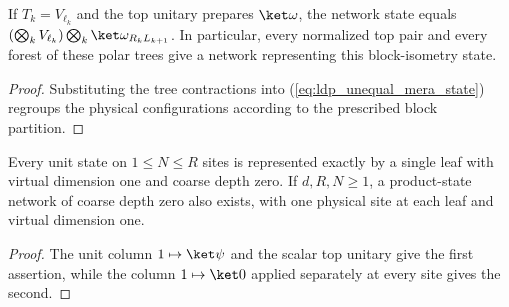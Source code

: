 \begin{lemma}
    \label{thm:ldp_unequal_mera_polar_state}
    \leanok
    If $T_k=V_{\ell_k}$ and the top unitary prepares $\ket\omega$,
    the network state equals
    $(\bigotimes_k V_{\ell_k})\bigotimes_k\ket\omega_{R_kL_{k+1}}$.
    In particular, every normalized top pair and every forest of
    these polar trees give a network representing this block-isometry state.
\end{lemma}
\begin{proof}
    \leanok
    Substituting the tree contractions into
    (\ref{eq:ldp_unequal_mera_state}) regroups the physical
    configurations according to the prescribed block partition.
\end{proof}

\begin{lemma}
    \label{thm:ldp_unequal_mera_caps}
    \leanok
    Every unit state on $1\le N\le R$ sites is represented exactly
    by a single leaf with virtual dimension one and coarse depth zero.
    If $d,R,N\ge1$, a product-state network of coarse depth zero
    also exists, with one physical site at each leaf and virtual
    dimension one.
\end{lemma}
\begin{proof}
    \leanok
    The unit column $1\mapsto\ket\psi$ and the scalar top unitary give
    the first assertion, while the column $1\mapsto\ket0$ applied
    separately at every site gives the second.
\end{proof}

